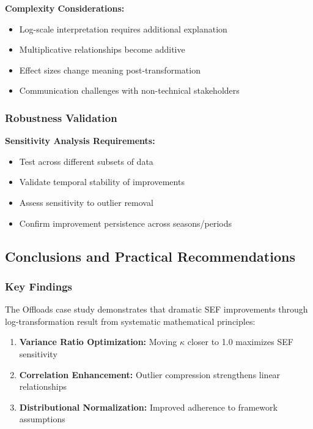 \textbf{Complexity Considerations:}
\begin{itemize}
    \item Log-scale interpretation requires additional explanation
    \item Multiplicative relationships become additive
    \item Effect sizes change meaning post-transformation
    \item Communication challenges with non-technical stakeholders
\end{itemize}

\subsubsection{Robustness Validation}

\textbf{Sensitivity Analysis Requirements:}
\begin{itemize}
    \item Test across different subsets of data
    \item Validate temporal stability of improvements
    \item Assess sensitivity to outlier removal
    \item Confirm improvement persistence across seasons/periods
\end{itemize}

\subsection{Conclusions and Practical Recommendations}

\subsubsection{Key Findings}

The Offloads case study demonstrates that dramatic SEF improvements through log-transformation result from systematic mathematical principles:

\begin{enumerate}
    \item \textbf{Variance Ratio Optimization:} Moving $\kappa$ closer to 1.0 maximizes SEF sensitivity
    \item \textbf{Correlation Enhancement:} Outlier compression strengthens linear relationships
    \item \textbf{Distributional Normalization:} Improved adherence to framework assumptions
\end{enumerate}

